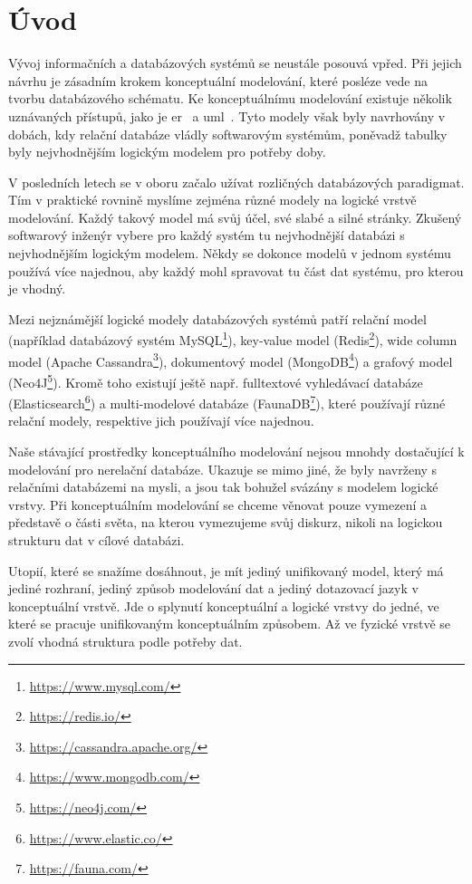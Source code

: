 \chapter*{Úvod}

Vývoj informačních a databázových systémů se neustále posouvá vpřed.
Při jejich návrhu je zásadním krokem konceptuální modelování, které posléze vede na tvorbu databázového schématu.
Ke konceptuálnímu modelování existuje několik uznávaných přístupů, jako je \acrfull{er}~\cite{chen_er_1976} a \acrfull{uml}~\cite{omg_uml_2017}.
Tyto modely však byly navrhovány v dobách, kdy relační databáze vládly softwarovým systémům, poněvadž tabulky byly nejvhodnějším logickým modelem pro potřeby doby.

V posledních letech se v oboru začalo užívat rozličných databázových paradigmat.
Tím v praktické rovnině myslíme zejména různé modely na logické vrstvě modelování.
Každý takový model má svůj účel, své slabé a silné stránky.
Zkušený softwarový inženýr vybere pro každý systém tu nejvhodnější databázi s nejvhodnějším logickým modelem.
Někdy se dokonce modelů v jednom systému používá více najednou, aby každý mohl spravovat tu část dat systému, pro kterou je vhodný.

Mezi nejznámější logické modely databázových systémů patří
relační model (například databázový systém MySQL\footnote{\url{https://www.mysql.com/}}),
key-value model (Redis\footnote{\url{https://redis.io/}}),
wide column model (Apache Cassandra\footnote{\url{https://cassandra.apache.org/}}),
dokumentový model (MongoDB\footnote{\url{https://www.mongodb.com/}}) a 
grafový model (Neo4J\footnote{\url{https://neo4j.com/}}).
Kromě toho existují ještě např. fulltextové vyhledávací databáze (Elasticsearch\footnote{\url{https://www.elastic.co/}}) a
multi-modelové databáze (FaunaDB\footnote{\url{https://fauna.com/}}), které používají různé relační modely, respektive jich používají více najednou.

Naše stávající prostředky konceptuálního modelování nejsou mnohdy dostačující k modelování pro nerelační databáze.
Ukazuje se mimo jiné, že byly navrženy s relačními databázemi na mysli, a jsou tak bohužel svázány s modelem logické vrstvy.
Při konceptuálním modelování se chceme věnovat pouze vymezení a představě o části světa, na kterou vymezujeme svůj diskurz, nikoli na logickou strukturu dat v cílové databázi.

Utopií, které se snažíme dosáhnout, je mít jediný unifikovaný model, který má jediné rozhraní, jediný způsob modelování dat a jediný dotazovací jazyk v konceptuální vrstvě.
Jde o splynutí konceptuální a logické vrstvy do jedné, ve které se pracuje unifikovaným konceptuálním způsobem.
Až ve fyzické vrstvě se zvolí vhodná struktura podle potřeby dat.

